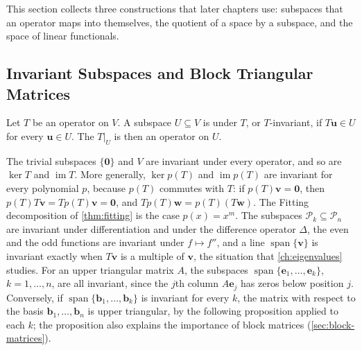 This section collects three constructions that later chapters use: subspaces that an operator maps into themselves, the quotient of a space by a subspace, and the space of linear functionals.

\subsection{Invariant Subspaces and Block Triangular Matrices}

\begin{definition}
\label{def:invariant}
Let $T$ be an operator on $V$. A subspace $U\subseteq V$ is  under $T$, or $T$-invariant, if $T\mathbf u\in U$ for every $\mathbf u\in U$. The  $T|_U$ is then an operator on $U$.
\end{definition}

The trivial subspaces $\{\mathbf 0\}$ and $V$ are invariant under every operator, and so are $\ker T$ and $\operatorname{im}T$. More generally, $\ker p(T)$ and $\operatorname{im}p(T)$ are invariant for every polynomial $p$, because $p(T)$ commutes with $T$: if $p(T)\mathbf v=\mathbf 0$, then $p(T)T\mathbf v=Tp(T)\mathbf v=\mathbf 0$, and $Tp(T)\mathbf w=p(T)(T\mathbf w)$. The Fitting decomposition of \cref{thm:fitting} is the case $p(x)=x^m$. The subspaces $\mathcal P_k\subseteq\mathcal P_n$ are invariant under differentiation and under the difference operator $\Delta$, the even and the odd functions are invariant under $f\mapsto f''$, and a line $\operatorname{span}\{\mathbf v\}$ is invariant exactly when $T\mathbf v$ is a multiple of $\mathbf v$, the situation that \cref{ch:eigenvalues} studies. For an upper triangular matrix $A$, the subspaces $\operatorname{span}\{\mathbf e_1,\ldots,\mathbf e_k\}$, $k=1,\ldots,n$, are all invariant, since the $j$th column $A\mathbf e_j$ has zeros below position $j$. Conversely, if $\operatorname{span}\{\mathbf b_1,\ldots,\mathbf b_k\}$ is invariant for every $k$, the matrix with respect to the basis $\mathbf b_1,\ldots,\mathbf b_n$ is upper triangular, by the following proposition applied to each $k$; the proposition also explains the importance of block matrices (\cref{sec:block-matrices}).

